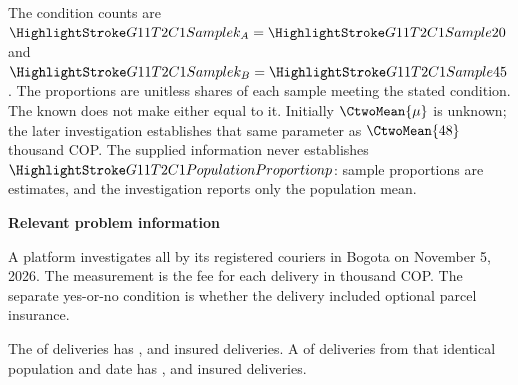 The condition counts are $\Sam{k_A}=\Sam{20}$ and $\Sam{k_B}=\Sam{45}$. The proportions are unitless shares of each sample meeting the stated condition. The known  does not make either  equal to it. Initially $\CtwoMean{\mu}$ is unknown; the later investigation establishes that same parameter as $\CtwoMean{48}$ thousand COP. The supplied information never establishes $\PP{p}$: sample proportions are estimates, and the investigation reports only the population mean.

\secInicio[][sec:p3]

\clearpage



\textbf{Relevant problem information}

\begin{probleminfoexcerpt}
A platform investigates all    by its registered couriers in Bogota on November 5, 2026. The measurement is the fee for each delivery in thousand COP. The separate yes-or-no condition is whether the delivery included optional parcel insurance.
\end{probleminfoexcerpt}

\begin{probleminfoexcerpt}
The     of  deliveries has     ,       and  insured deliveries. A     of  deliveries from that identical population and date has     ,       and  insured deliveries.
\end{probleminfoexcerpt}



